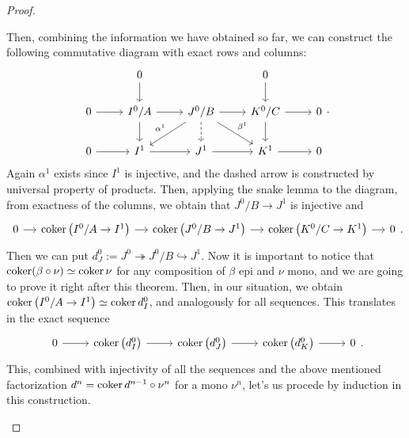 \documentclass[../Main]{subfiles}
\begin{document}
\begin{proof}
\begin{enumerate}
		Then, combining the information we have obtained so far, we can
		construct the following commutative diagram with exact rows and columns:
		\begin{equation}
		\begin{tikzcd}
			&
			0 \arrow[d, "", rightarrow] & &
			0 \arrow[d, "", rightarrow] & \\
			0 \arrow[r, "", rightarrow] &
			I^0/A \arrow[r, "", rightarrow] \arrow[d, "", rightarrow] &
			J^0/B \arrow[r, "", rightarrow] \arrow[ld, "\alpha^1"', rightarrow] 
			\arrow[d, "", dashrightarrow] \arrow[rd, "\beta^1", rightarrow] &
			K^0/C \arrow[r, "", rightarrow] \arrow[d, "", rightarrow] &
			0 \\
			0 \arrow[r, "", rightarrow] &
			I^1 \arrow[r, "", rightarrow] &
			J^1 \arrow[r, "", rightarrow] &
			K^1 \arrow[r, "", rightarrow] &
			0
		\end{tikzcd}
		.\end{equation} 
		Again $\alpha^1$ exists since $I^1$ is injective, and the dashed arrow
		is constructed by universal property of products.
		Then, applying the snake lemma to the diagram, from exactness of the columns, we obtain
		that $J^0/B \to J^1$ is injective and
		\begin{equation}
		\begin{tikzcd}[column sep=small]
			0 \arrow[r, "", rightarrow] &
			\coker \left( I^0/A \to I^1 \right) \arrow[r, "", rightarrow] &
			\coker \left( J^0/B \to J^1 \right) \arrow[r, "", rightarrow] &
			\coker \left( K^0/C \to K^1 \right) \arrow[r, "", rightarrow] &
			0
		\end{tikzcd}
		.\end{equation} 
		Then we can put $d^0_J := J^0 \twoheadrightarrow J^0/B \hookrightarrow J^1$.
		Now it is important to notice that $\operatorname{coker} (\beta \circ \nu) \simeq \operatorname{coker} \nu$ for
		any composition of $\beta$ epi and $\nu$ mono, and we are going to prove it right
		after this theorem.
		Then, in our situation, we obtain 
		$\operatorname{coker} \left( I^0/A \to I^1 \right) \simeq \operatorname{coker} d^0_I$, and analogously for
		all sequences.
		This translates in the exact sequence
		\begin{equation}
		\begin{tikzcd}
			0 \arrow[r, "", rightarrow] &
			\coker \left( d^0_I\right) \arrow[r, "", rightarrow] &
			\coker \left( d^0_J \right) \arrow[r, "", rightarrow] &
			\coker \left( d^0_K \right) \arrow[r, "", rightarrow] &
			0
		\end{tikzcd}
		.\end{equation} 
		This, combined with injectivity of all the sequences and the above mentioned
		factorization $d^n = \operatorname{coker} d^{n-1} \circ \nu^n$ for a mono $\nu^n$,
		let's us procede by induction in this construction.
		

\end{enumerate}
\end{proof}
\end{document}
